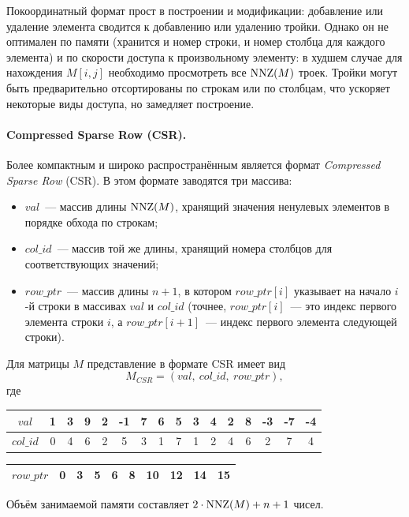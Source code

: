 Покоординатный формат прост в построении и модификации: добавление или удаление элемента сводится к добавлению или удалению тройки.
Однако он не оптимален по памяти (хранится и номер строки, и номер столбца для каждого элемента) и по скорости доступа к произвольному элементу: в худшем случае для нахождения $M[i,j]$ необходимо просмотреть все $\operatorname{NNZ}(M)$ троек.
Тройки могут быть предварительно отсортированы по строкам или по столбцам, что ускоряет некоторые виды доступа, но замедляет построение.

\paragraph{Compressed Sparse Row (CSR).}
Более компактным и широко распространённым является формат \emph{Compressed Sparse Row}%
(CSR).
В этом формате заводятся три массива:
\begin{itemize}
    \item $val$~--- массив длины $\operatorname{NNZ}(M)$, хранящий значения ненулевых элементов в порядке обхода по строкам;
    \item $col\_id$~--- массив той же длины, хранящий номера столбцов для соответствующих значений;
    \item $row\_ptr$~--- массив длины $n + 1$, в котором $row\_ptr[i]$ указывает на начало $i$-й строки в массивах $val$ и $col\_id$ (точнее, $row\_ptr[i]$~--- это индекс первого элемента строки $i$, а $row\_ptr[i+1]$~--- индекс первого элемента следующей строки).
\end{itemize}

\begin{example}
    Для матрицы $M$ представление в формате CSR имеет вид
    \[
        M_{\textit{CSR}} = (val,\ col\_id,\ row\_ptr),
    \]
    где
    \begin{center}
        \begin{tabular}{|c||c|c|c|c|c|c|c|c|c|c|c|c|c|c|c|}
            \hline
            $val$     & 1 & 3 & 9 & 2 & -1 & 7 & 6 & 5 & 3 & 4 & 2 & 8 & -3 & -7 & -4\\
            \hline
            $col\_id$ & 0 & 4 & 6 & 2 & 5  & 3 & 1 & 7 & 1 & 2 & 4 & 6 & 2  & 7  & 4\\
            \hline
        \end{tabular}

        \vspace{0.5em}

        \begin{tabular}{|c||c|c|c|c|c|c|c|c|c|}
            \hline
            $row\_ptr$ & 0 & 3 & 5 & 6 & 8 & 10 & 12 & 14 & 15\\
            \hline
        \end{tabular}
    \end{center}
    Объём занимаемой памяти составляет $2 \cdot \operatorname{NNZ}(M) + n + 1$ чисел.
\end{example}

